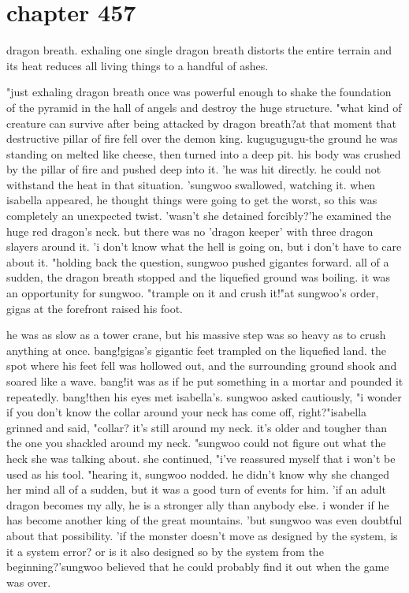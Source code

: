 \section{chapter 457}

dragon breath.
 exhaling one single dragon breath distorts the entire terrain and its heat reduces all living things to a handful of ashes.





"just exhaling dragon breath once was powerful enough to shake the foundation of the pyramid in the hall of angels and destroy the huge structure.
"what kind of creature can survive after being attacked by dragon breath?at that moment that destructive pillar of fire fell over the demon king.
kugugugugu-the ground he was standing on melted like cheese, then turned into a deep pit.
his body was crushed by the pillar of fire and pushed deep into it.
'he was hit directly.
 he could not withstand the heat in that situation.
'sungwoo swallowed, watching it.
when isabella appeared, he thought things were going to get the worst, so this was completely an unexpected twist.
'wasn't she detained forcibly?'he examined the huge red dragon's neck.
 but there was no 'dragon keeper' with three dragon slayers around it.
'i don't know what the hell is going on, but i don't have to care about it.
"holding back the question, sungwoo pushed gigantes forward.
 all of a sudden, the dragon breath stopped and the liquefied ground was boiling.
it was an opportunity for sungwoo.
"trample on it and crush it!"at sungwoo's order, gigas at the forefront raised his foot.

he was as slow as a tower crane, but his massive step was so heavy as to crush anything at once.
bang!gigas's gigantic feet trampled on the liquefied land.
 the spot where his feet fell was hollowed out, and the surrounding ground shook and soared like a wave.
bang!it was as if he put something in a mortar and pounded it repeatedly.
bang!then his eyes met isabella's.
sungwoo asked cautiously, "i wonder if you don't know the collar around your neck has come off, right?"isabella grinned and said, "collar? it's still around my neck.
 it's older and tougher than the one you shackled around my neck.
"sungwoo could not figure out what the heck she was talking about.
she continued, "i've reassured myself that i won't be used as his tool.
"hearing it, sungwoo nodded.
 he didn't know why she changed her mind all of a sudden, but it was a good turn of events for him.
'if an adult dragon becomes my ally, he is a stronger ally than anybody else.
 i wonder if he has become another king of the great mountains.
'but sungwoo was even doubtful about that possibility.
'if the monster doesn't move as designed by the system, is it a system error? or is it also designed so by the system from the beginning?'sungwoo believed that he could probably find it out when the game was over.

